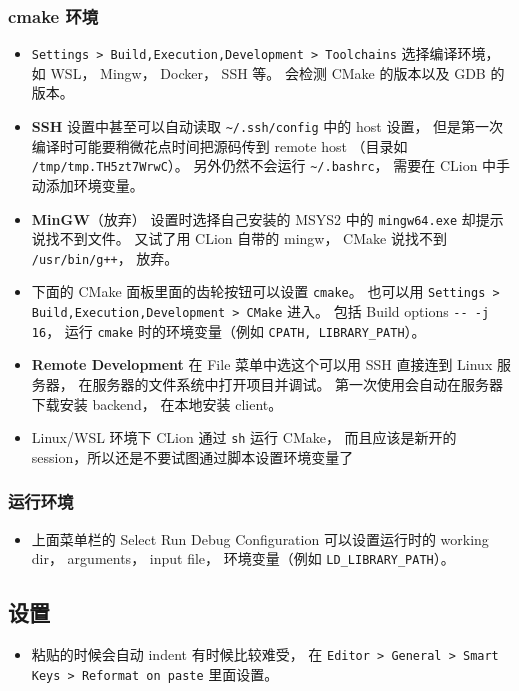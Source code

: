 \subsubsection{cmake 环境}
\begin{itemize}
\item \verb|Settings > Build,Execution,Development > Toolchains| 选择编译环境， 如 WSL， Mingw， Docker， SSH 等。 会检测 CMake 的版本以及 GDB 的版本。
\item \textbf{SSH} 设置中甚至可以自动读取 \verb|~/.ssh/config| 中的 host 设置， 但是第一次编译时可能要稍微花点时间把源码传到 remote host （目录如 \verb|/tmp/tmp.TH5zt7WrwC|）。 另外仍然不会运行 \verb|~/.bashrc|， 需要在 CLion 中手动添加环境变量。
\item \textbf{MinGW}（放弃） 设置时选择自己安装的 MSYS2 中的 \verb|mingw64.exe| 却提示说找不到文件。 又试了用 CLion 自带的 mingw， CMake 说找不到 \verb|/usr/bin/g++|， 放弃。
\item 下面的 CMake 面板里面的齿轮按钮可以设置 \verb|cmake|。 也可以用 \verb|Settings > Build,Execution,Development > CMake| 进入。 包括 Build options \verb|-- -j 16|， 运行 \verb|cmake| 时的环境变量（例如 \verb|CPATH, LIBRARY_PATH|）。
\item \textbf{Remote Development} 在 File 菜单中选这个可以用 SSH 直接连到 Linux 服务器， 在服务器的文件系统中打开项目并调试。 第一次使用会自动在服务器下载安装 backend， 在本地安装 client。
\item Linux/WSL 环境下 CLion 通过 \verb|sh| 运行 CMake， 而且应该是新开的 session，所以还是不要试图通过脚本设置环境变量了
\end{itemize}

\subsubsection{运行环境}
\begin{itemize}
\item 上面菜单栏的 Select Run Debug Configuration 可以设置运行时的 working dir， arguments， input file， 环境变量（例如 \verb|LD_LIBRARY_PATH|）。
\end{itemize}

\subsection{设置}
\begin{itemize}
\item 粘贴的时候会自动 indent 有时候比较难受， 在 \verb|Editor > General > Smart Keys > Reformat on paste| 里面设置。
\end{itemize}
